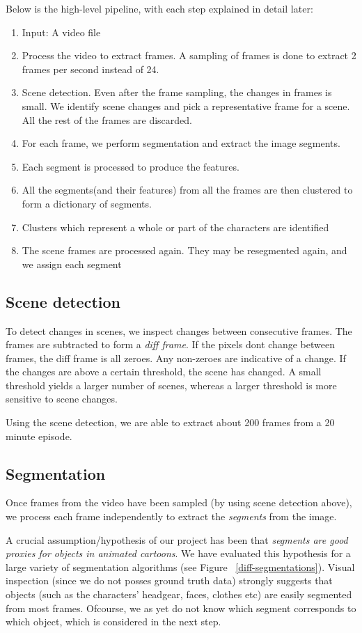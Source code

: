 \documentclass[10pt,twocolumn,letterpaper]{article}
\begin{document}
Below is the high-level pipeline, with each step explained in detail
later:
\begin{enumerate}
\item Input: A video file
\item Process the video to extract frames. A sampling of frames is
  done to extract 2 frames per second instead of 24.
\item Scene detection. Even after the frame sampling, the changes in
  frames is small. We identify scene changes and pick a representative
  frame for a scene. All the rest of the frames are discarded. 
\item For each frame, we perform segmentation and extract the image segments.
\item Each segment is processed to produce the features.
\item All the segments(and their features) from all the frames are
  then clustered to form a dictionary of segments.
\item Clusters which represent a whole or part of the characters are identified
\item The scene frames are processed again. They may be resegmented
  again, and we assign each segment 
\end{enumerate}

\subsection{Scene detection}
To detect changes in scenes, we inspect changes between consecutive
frames. The frames are subtracted to form a \emph{diff frame}. If the
pixels dont change between frames, the diff frame is all zeroes. Any
non-zeroes are indicative of a change. If the changes are above a
certain threshold, the scene has changed. A small threshold yields a
larger number of scenes, whereas a larger threshold is more sensitive
to scene changes. 

Using the scene detection, we are able to extract about 200 frames
from a 20 minute episode. 

\subsection{Segmentation}

Once frames from the video have been sampled (by using scene detection
above), we process each frame independently to extract the
\emph{segments} from the image. 

A crucial assumption/hypothesis of our project has been that
\emph{segments are good proxies for objects in animated cartoons}.  We
have evaluated this hypothesis for a large variety of segmentation
algorithms (see Figure ~\ref{diff-segmentations}). Visual inspection
(since we do not posses ground truth data) strongly suggests that
objects (such as the characters' headgear, faces, clothes etc) are
easily segmented from most frames. Ofcourse, we as yet do not know
which segment corresponds to which object, which is considered in the
next step. 
\end{document}
